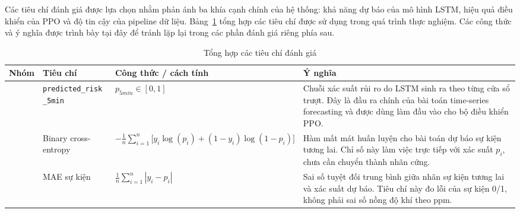 Các tiêu chí đánh giá được lựa chọn nhằm phản ánh ba khía cạnh chính của hệ thống: khả năng dự báo của mô hình LSTM, hiệu quả điều khiển của PPO và độ tin cậy của pipeline dữ liệu. Bảng~\ref{tab:metrics} tổng hợp các tiêu chí được sử dụng trong quá trình thực nghiệm. Các công thức và ý nghĩa được trình bày tại đây để tránh lặp lại trong các phần đánh giá riêng phía sau.

\begingroup
\footnotesize
\renewcommand{\arraystretch}{1.28}
\setlength{\tabcolsep}{2pt}

\setlength{\LTleft}{-0.35cm}
\setlength{\LTright}{-0.35cm}

\begin{longtable}{
  >{\centering\arraybackslash}p{1.6cm}
  >{\raggedright\arraybackslash}p{3.0cm}
  >{\raggedright\arraybackslash}p{3.6cm}
  >{\raggedright\arraybackslash}p{\dimexpr\textwidth+0.7cm-1.6cm-3.0cm-3.6cm-8\tabcolsep\relax}
}
\caption{Tổng hợp các tiêu chí đánh giá}
\label{tab:metrics} \\
\toprule
\textbf{Nhóm} 
& \textbf{Tiêu chí} 
& \textbf{Công thức / cách tính} 
& \textbf{Ý nghĩa} \\
\midrule
\endfirsthead

\endhead

\endfoot

\bottomrule
\endlastfoot

\multirow{7}{*}{\textbf{LSTM}}
& \makecell[l]{\texttt{predicted\_risk}\\\texttt{\_5min}}
& $p_{5min} \in [0,1]$
& Chuỗi xác suất rủi ro do LSTM sinh ra theo từng cửa sổ trượt. Đây là đầu ra chính của bài toán time-series forecasting và được dùng làm đầu vào cho bộ điều khiển PPO. \\

& Binary cross-entropy
& $\displaystyle -\frac{1}{n}\sum_{i=1}^{n}\bigl[y_i\log(p_i)+(1-y_i)\log(1-p_i)\bigr]$
& Hàm mất mát huấn luyện cho bài toán dự báo sự kiện tương lai. Chỉ số này làm việc trực tiếp với xác suất $p_i$, chưa cần chuyển thành nhãn cứng. \\

& MAE sự kiện
& $\displaystyle \frac{1}{n}\sum_{i=1}^{n}|y_i-p_i|$
& Sai số tuyệt đối trung bình giữa nhãn sự kiện tương lai và xác suất dự báo. Tiêu chí này đo lỗi của sự kiện 0/1, không phải sai số nồng độ khí theo ppm. \\


\end{longtable}
